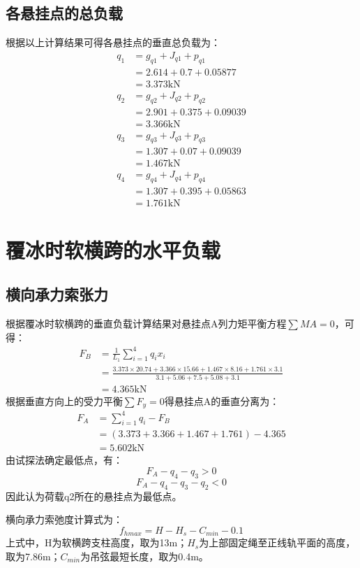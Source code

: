 \subsection{各悬挂点的总负载}
根据以上计算结果可得各悬挂点的垂直总负载为：
\begin{align*}
	q_1&=g_{q1}+J_{q1}+p_{q1}
	\\
	&=2.614+0.7+0.05877
	\\
	&=3.373\mathrm{ kN}
	\\
	q_2&=g_{q2}+J_{q2}+p_{q2}
	\\
	&=2.901+0.375+0.09039
	\\
	&=3.366\mathrm{ kN}
	\\
	q_3&=g_{q3}+J_{q3}+p_{q3}
	\\
	&=1.307+0.07+0.09039
	\\
	&=1.467\mathrm{ kN}
	\\
	q_4&=g_{q4}+J_{q4}+p_{q4}
	\\
	&=1.307+0.395+0.05863
	\\
	&=1.761\mathrm{ kN}
\end{align*}
\section{覆冰时软横跨的水平负载}
\subsection{横向承力索张力}
根据覆冰时软横跨的垂直负载计算结果对悬挂点A列力矩平衡方程$\sum MA=0$，可得：
\begin{align*}
	F_B&=\frac{1}{L_1}\sum\nolimits_{i=1}^4{q_ix_i}
	\\
	&=\frac{3.373\times 20.74+3.366\times 15.66+1.467\times 8.16+1.761\times 3.1}{3.1+5.06+7.5+5.08+3.1}
	\\
	&=4.365\mathrm{ kN}
\end{align*}
根据垂直方向上的受力平衡$\sum F_y=0$得悬挂点A的垂直分离为：
\begin{align*}
	F_A&=\sum\nolimits_{i=1}^4{q_i-F_B}
	\\
	&=(3.373+3.366+1.467+1.761)-4.365
	\\
	&=5.602\mathrm{ kN}
\end{align*}
由试探法确定最低点，有：
$$
F_A-q_4-q_3>0
$$
$$
F_A-q_4-q_3-q_2<0
$$
因此认为荷载q2所在的悬挂点为最低点。

横向承力索弛度计算式为：
$$
f_{hmax}=H-H_s-C_{min}-0.1
$$
上式中，H为软横跨支柱高度，取为13m；$H_s$为上部固定绳至正线轨平面的高度，取为7.86m；$C_{min}$为吊弦最短长度，取为0.4m。

